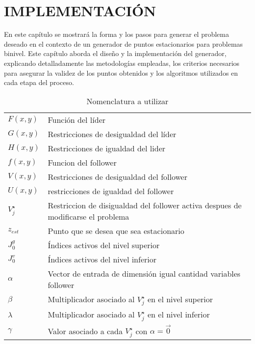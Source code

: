 \chapter{IMPLEMENTACIÓN}

En este capítulo se mostrará la forma y los pasos para generar el problema deseado en el contexto de un generador de puntos estacionarios para problemas binivel. Este capítulo aborda el diseño y la implementación del generador, explicando detalladamente las metodologías empleadas, los criterios necesarios para asegurar la validez de los puntos obtenidos y los algoritmos utilizados en cada etapa del proceso.

\begin{table}[H]
    \centering
    \caption{Nomenclatura a utilizar}
    \begin{tabular}{l m{360pt}}
        $ F(x,y) $              & Función del líder                                                                                                          \\
        $ G(x,y) $              & Restricciones de desigualdad del líder                                                                                                            \\
        $ H(x,y) $                 & Restricciones de igualdad del lider                       \\
        $ f(x,y) $           & Funcion del follower                                                               \\
        $ V(x,y) $              &  Restricciones de desigualdad del follower  \\
        $ U(x,y) $     & restricciones de igualdad del follower\\
        $ V_{j}^{\star} $    & Restriccion de disigualdad del follower activa despues de modificarse el problema            \\
        $z_{est}$         & Punto que se desea que sea estacionario\\
        $J_0^g$   & Índices activos del nivel superior \\
        $J_0^v$   & Índices activos del nivel inferior \\
        $ \alpha  $             & Vector de entrada de dimensión igual cantidad variables follower                                                                                                      \\
        $ \beta $               & Multiplicador asociado al $V_{j}^{\star}$ en el nivel superior          \\
        $ \lambda $              & Multiplicador asociado al $V_{j}^{\star}$ en el nivel inferior\\
        $\gamma$                & Valor asociado a cada $V_{j}^{\star}$ con $\alpha=\vec{0}$\\
    \end{tabular}

    \end{table}


